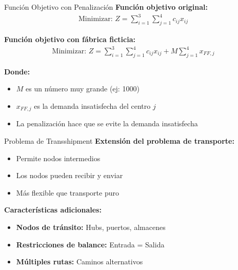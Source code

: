 \documentclass{beamer}
\begin{document}
\begin{frame}{Función Objetivo con Penalización}
    \textbf{Función objetivo original:}
    \begin{align*}
        \text{Minimizar: } Z = \sum_{i=1}^3 \sum_{j=1}^4 c_{ij}x_{ij}
    \end{align*}
    
    \vspace{1em}
    \textbf{Función objetivo con fábrica ficticia:}
    \begin{align*}
        \text{Minimizar: } Z = \sum_{i=1}^3 \sum_{j=1}^4 c_{ij}x_{ij} + M \sum_{j=1}^4 x_{FF,j}
    \end{align*}
    
    \vspace{1em}
    \textbf{Donde:}
    \begin{itemize}
        \item $M$ es un número muy grande (ej: 1000)
        \item $x_{FF,j}$ es la demanda insatisfecha del centro $j$
        \item La penalización hace que se evite la demanda insatisfecha
    \end{itemize}
\end{frame}

\begin{frame}{Problema de Transshipment}
    \textbf{Extensión del problema de transporte:}
    \begin{itemize}
        \item Permite nodos intermedios
        \item Los nodos pueden recibir y enviar
        \item Más flexible que transporte puro
    \end{itemize}
    
    \vspace{1em}
    \textbf{Características adicionales:}
    \begin{itemize}
        \item[{\makebox[1em][c]{\textcolor{black}{\faCube}}}] \textbf{Nodos de tránsito:} Hubs, puertos, almacenes
        \item[{\makebox[1em][c]{\textcolor{black}{\faBalanceScale}}}] \textbf{Restricciones de balance:} Entrada = Salida
        \item[{\makebox[1em][c]{\textcolor{black}{\faRoad}}}] \textbf{Múltiples rutas:} Caminos alternativos
    \end{itemize}
\end{frame}
\end{document}

